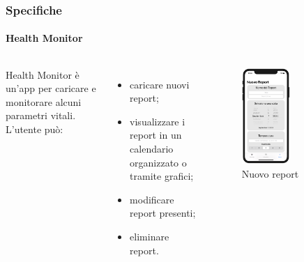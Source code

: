 \documentclass{beamer}
\begin{document}
\begin{frame}
\frametitle{Specifiche}
\framesubtitle{Health Monitor}	   
\begin{columns}
Health Monitor è un'app per caricare e monitorare alcuni parametri vitali. L'utente può:
\begin{itemize}
  \item caricare nuovi report;
  \item visualizzare i report in un calendario organizzato o tramite grafici;
  \item modificare report presenti;
  \item eliminare report.
\end{itemize}
	
	\centering 
	\begin{figure}[h]
	\includegraphics[width=0.55\textwidth]{../img/nuovo_iniziale.png}
	\caption{Nuovo report}
	\end{figure}
\end{columns}
\end{frame}
\end{document}
